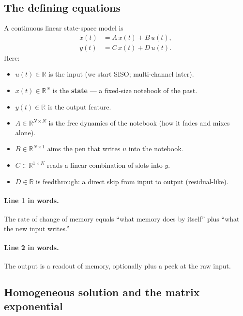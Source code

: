 \documentclass[11pt,a4paper]{article}
\begin{document}
\subsection{The defining equations}

A continuous linear state-space model is
\begin{equation}
\begin{aligned}
\dot{x}(t) &= A\,x(t)+B\,u(t),\\
y(t) &= C\,x(t)+D\,u(t).
\end{aligned}
\label{eq:cont}
\end{equation}
Here:
\begin{itemize}[leftmargin=*]
  \item $u(t)\in\mathbb{R}$ is the input (we start SISO; multi-channel later).
  \item $x(t)\in\mathbb{R}^N$ is the \textbf{state} --- a fixed-size notebook of the past.
  \item $y(t)\in\mathbb{R}$ is the output feature.
  \item $A\in\mathbb{R}^{N\times N}$ is the free dynamics of the notebook (how it fades and mixes alone).
  \item $B\in\mathbb{R}^{N\times 1}$ aims the pen that writes $u$ into the notebook.
  \item $C\in\mathbb{R}^{1\times N}$ reads a linear combination of slots into $y$.
  \item $D\in\mathbb{R}$ is feedthrough: a direct skip from input to output (residual-like).
\end{itemize}

\paragraph{Line 1 in words.}
The rate of change of memory equals ``what memory does by itself'' plus ``what the new input writes.''

\paragraph{Line 2 in words.}
The output is a readout of memory, optionally plus a peek at the raw input.

\subsection{Homogeneous solution and the matrix exponential}
\end{document}
